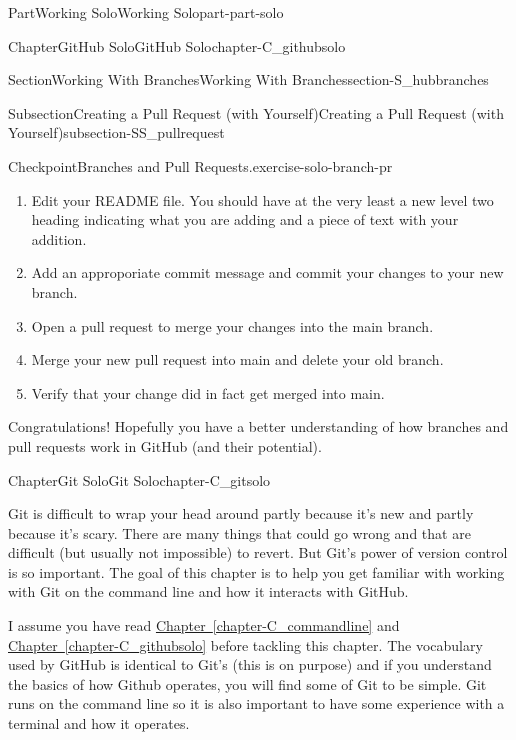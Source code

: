 \documentclass[oneside,10pt,]{book}
\newcommand{\xreffont}{\relax}
\begin{document}
\begin{partptx}{Part}{Working Solo}{}{Working Solo}{}{}{part-part-solo}
\begin{chapterptx}{Chapter}{GitHub Solo}{}{GitHub Solo}{}{}{chapter-C_githubsolo}
\begin{sectionptx}{Section}{Working With Branches}{}{Working With Branches}{}{}{section-S_hubbranches}
\begin{subsectionptx}{Subsection}{Creating a Pull Request (with Yourself)}{}{Creating a Pull Request (with Yourself)}{}{}{subsection-SS_pullrequest}
\begin{inlineexercise}{Checkpoint}{Branches and Pull Requests.}{exercise-solo-branch-pr}
\begin{enumerate}[font=\bfseries,label=(\alph*),ref=\alph*]
\item{}Edit your README file. You should have at the very least a new level two heading indicating what you are adding and a piece of text with your addition.%
\item{}Add an approporiate commit message and commit your changes to your new branch.%
\item{}Open a pull request to merge your changes into the main branch.%
\item{}Merge your new pull request into main and delete your old branch.%
\item{}Verify that your change did in fact get merged into main.%
\end{enumerate}%
\end{inlineexercise}%
\end{subsectionptx}
\begin{conclusion}{}%
Congratulations! Hopefully you have a better understanding of how branches and pull requests work in GitHub (and their potential).%
\end{conclusion}%
\end{sectionptx}
\end{chapterptx}
%
\typeout{************************************************}
\typeout{************************************************}
%
\begin{chapterptx}{Chapter}{Git Solo}{}{Git Solo}{}{}{chapter-C_gitsolo}
\renewcommand*{\chaptername}{Chapter}
%
%
\begin{introduction}{}%
Git is difficult to wrap your head around partly because it's new and partly because it's scary. There are many things that could go wrong and that are difficult (but usually not impossible) to revert. But Git's power of version control is so important. The goal of this chapter is to help you get familiar with working with Git on the command line and how it interacts with GitHub.%
\par
I assume you have read \hyperref[chapter-C_commandline]{Chapter~{\xreffont\ref{chapter-C_commandline}}} and \hyperref[chapter-C_githubsolo]{Chapter~{\xreffont\ref{chapter-C_githubsolo}}} before tackling this chapter. The vocabulary used by GitHub is identical to Git's (this is on purpose) and if you understand the basics of how Github operates, you will find some of Git to be simple. Git runs on the command line so it is also important to have some experience with a terminal and how it operates.%
\par

\end{introduction}
\end{chapterptx}
\end{partptx}
\end{document}
